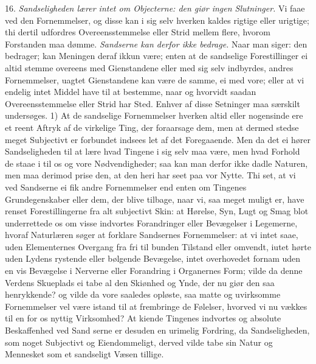 \documentclass[12pt,a4paper]{article}
\newcommand{\opage}[1]{\marginnote{\footnotesize\textit{[#1]}}}
\begin{document}
16. \emph{Sandseligheden lærer intet om Objecterne: den giør ingen Slutninger.} Vi faae
ved den Fornemmelser, og disse kan i sig selv hverken kaldes rigtige eller urigtige; thi
dertil udfordres Overeensstemmelse eller Strid mellem flere, hvorom Forstanden maa
dømme. \emph{Sandserne kan derfor ikke bedrage.} Naar man siger: den bedrager; kan
Meningen deraf ikkun være; enten at de sandselige Forestillinger ei altid stemme
overeens med Gienstandene eller med sig selv indbyrdes, andres Fornemmelser, uagtet
Gienstandene kan være de samme, ei med vore; eller at vi endelig intet Middel have til
at bestemme, naar og hvorvidt saadan Overeensstemmelse eller Strid har Sted. Enhver af
disse Setninger maa særskilt undersøges. 1)
\opage{87} At de sandselige Fornemmelser hverken altid eller nogensinde ere et reent Aftryk af de
virkelige Ting, der foraarsage dem, men at dermed stedse meget Subjectivt er forbundet
indsees let af det Foregaaende. Men da det ei hører Sandseligheden til at lære hvad
Tingene i sig selv maa være, men hvad Forhold de staae i til os og vore Nødvendigheder;
saa kan man derfor ikke dadle Naturen, men maa derimod prise den, at den heri har seet
paa vor Nytte. Thi set, at vi ved Sandserne ei fik andre Fornemmelser end enten om
Tingenes Grundegenskaber eller dem, der blive tilbage, naar vi, saa meget muligt er,
have renset Forestillingerne fra alt subjectivt Skin: at Hørelse, Syn, Lugt og Smag blot
underrettede os om visse indvortes Forandringer eller Bevægelser i Legemerne, hvoraf
Naturlæren søger at forklare Sandsernes Fornemmelser: at vi intet saae, uden
Elementernes Overgang fra fri til bunden Tilstand eller omvendt, iutet hørte uden Lydens
rystende eller bølgende Bevægelse, intet overhovedet fornam uden en vis Bevægelse i
Nerverne eller Forandring i Organernes Form; vilde da denne Verdens Skueplads ei tabe al
den Skiønhed og Ynde, der nu giør den saa henrykkende? og vilde da vore saaledes
opløste, saa matte og uvirksomme Fornemmelser vel være istand til at frembringe de
Følelser, hvorved vi nu vækkes til en for os nyttig Virksomhed? At kiende Tingenes
indvortes og absolute Beskaffenhed ved Sand%
\opage{88}serne er desuden en urimelig Fordring, da Sandseligheden, som noget Subjectivt og
Eiendommeligt, derved vilde tabe sin Natur og Mennesket som et sandseligt Væsen tillige.
\end{document}
